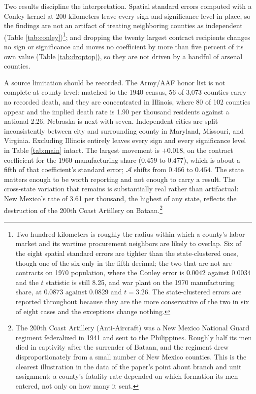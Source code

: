 \documentclass[12pt]{article}
\begin{document}
Two results discipline the interpretation. Spatial standard errors computed with a
Conley kernel at 200 kilometers leave every sign and significance level in place,
so the findings are not an artifact of treating neighboring counties as
independent (Table \ref{tab:conley})\footnote{Two hundred kilometers is roughly
the radius within which a county's labor market and its wartime procurement
neighbors are likely to overlap. Six of the eight spatial standard errors are
tighter than the state-clustered ones, though one of the six only in the fifth
decimal; the two that are not are contracts on 1970
population, where the Conley error is 0.0042 against 0.0034 and the $t$ statistic
is still 8.25, and war plant on the 1970 manufacturing share, at 0.0873 against
0.0829 and $t = 3.26$. The state-clustered errors are reported throughout because
they are the more conservative of the two in six of eight cases and the exceptions
change nothing.}; and dropping the twenty largest contract
recipients changes no sign or significance and moves no coefficient by more than
five percent of its own value (Table \ref{tab:droptop}), so
they are not driven by a handful of arsenal counties.

A source limitation should be recorded. The Army/AAF honor list is not complete
at county level: matched to the 1940 census, 56 of 3{,}073 counties carry no
recorded death, and they are concentrated in Illinois, where 80 of 102 counties
appear and the implied death rate is 1.90 per thousand residents against a
national 2.26. Nebraska is next with seven. Independent cities are
split inconsistently between city and surrounding county in Maryland, Missouri, and
Virginia. Excluding Illinois entirely leaves every sign and every
significance level in Table \ref{tab:main} intact. The largest movement is
$+0.018$, on the contract coefficient for the 1960 manufacturing share
($0.459$ to $0.477$), which is about a fifth of that coefficient's standard
error; $\mathcal{A}$ shifts from $0.466$ to $0.454$. The state matters enough to
be worth reporting and not enough to carry a result.
The cross-state variation that remains is substantially real rather than
artifactual: New Mexico's rate of 3.61 per thousand, the highest of any state,
reflects the destruction of the 200th Coast Artillery on Bataan.\footnote{The 200th Coast Artillery (Anti-Aircraft) was a New Mexico National Guard regiment federalized in 1941 and sent to the Philippines. Roughly half its men died in captivity after the surrender of Bataan, and the regiment drew disproportionately from a small number of New Mexico counties. This is the clearest illustration in the data of the paper's point about branch and unit assignment: a county's fatality rate depended on which formation its men entered, not only on how many it sent.}
\end{document}
